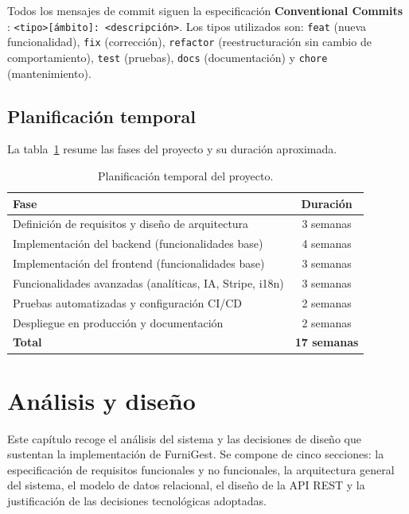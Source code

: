 \documentclass[12pt,twoside,titlepage]{report}
\newcommand\blankpage{%
    \newpage
    \null
    \thispagestyle{empty}%
    \newpage}
\begin{document}
Todos los mensajes de commit siguen la especificación \textbf{Conventional Commits} \cite{conventionalcommits}: \texttt{<tipo>[ámbito]: <descripción>}. Los tipos utilizados son: \texttt{feat} (nueva funcionalidad), \texttt{fix} (corrección), \texttt{refactor} (reestructuración sin cambio de comportamiento), \texttt{test} (pruebas), \texttt{docs} (documentación) y \texttt{chore} (mantenimiento).

\section{Planificación temporal}

La tabla~\ref{tab:planificacion} resume las fases del proyecto y su duración aproximada.

\begin{table}[H]
  \centering
  \caption{Planificación temporal del proyecto.}
  \label{tab:planificacion}
  \begin{tabular}{lc}
    \toprule
    \textbf{Fase} & \textbf{Duración} \\
    \midrule
    Definición de requisitos y diseño de arquitectura & 3 semanas \\
    Implementación del backend (funcionalidades base) & 4 semanas \\
    Implementación del frontend (funcionalidades base) & 3 semanas \\
    Funcionalidades avanzadas (analíticas, IA, Stripe, i18n) & 3 semanas \\
    Pruebas automatizadas y configuración CI/CD & 2 semanas \\
    Despliegue en producción y documentación & 2 semanas \\
    \midrule
    \textbf{Total} & \textbf{17 semanas} \\
    \bottomrule
  \end{tabular}
\end{table}

\blankpage


%
%
\chapter{Análisis y diseño}

Este capítulo recoge el análisis del sistema y las decisiones de diseño que sustentan la implementación de FurniGest. Se compone de cinco secciones: la especificación de requisitos funcionales y no funcionales, la arquitectura general del sistema, el modelo de datos relacional, el diseño de la API REST y la justificación de las decisiones tecnológicas adoptadas.
\end{document}
